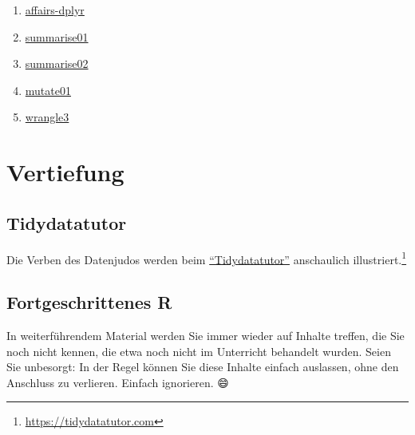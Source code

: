 \documentclass[
  letterpaper,
]{scrbook}
\theoremstyle{definition}
\theoremstyle{definition}
\theoremstyle{definition}
\theoremstyle{remark}
\begin{document}
\begin{enumerate}
\item
  \href{https://sebastiansauer.github.io/Datenwerk/posts/affairs-dplyr/affairs-dplyr.html}{affairs-dplyr}
\item
  \href{https://sebastiansauer.github.io/Datenwerk/posts/summarise01/summarise01.html}{summarise01}
\item
  \href{https://sebastiansauer.github.io/Datenwerk/posts/summarise02/summarise02.html}{summarise02}
\item
  \href{https://sebastiansauer.github.io/Datenwerk/posts/mutate01/mutate01.html}{mutate01}
\item
  \href{https://sebastiansauer.github.io/Datenwerk/posts/wrangle3/wrangle3}{wrangle3}
\end{enumerate}

\section{Vertiefung}\label{vertiefung-3}

\subsection{Tidydatatutor}\label{tidydatatutor}

Die Verben des Datenjudos werden beim
\href{https://tidydatatutor.com/}{\enquote{Tidydatatutor}} anschaulich
illustriert.\footnote{\url{https://tidydatatutor.com}}

\subsection{Fortgeschrittenes R}\label{fortgeschrittenes-r}

\begin{tcolorbox}[enhanced jigsaw, colbacktitle=quarto-callout-note-color!10!white, toptitle=1mm, colframe=quarto-callout-note-color-frame, breakable, toprule=.15mm, bottomrule=.15mm, bottomtitle=1mm, left=2mm, opacitybacktitle=0.6, colback=white, arc=.35mm, coltitle=black, title=\textcolor{quarto-callout-note-color}{\faInfo}\hspace{0.5em}{Hinweis}, opacityback=0, rightrule=.15mm, leftrule=.75mm, titlerule=0mm]

In weiterführendem Material werden Sie immer wieder auf Inhalte treffen,
die Sie noch nicht kennen, die etwa noch nicht im Unterricht behandelt
wurden. Seien Sie unbesorgt: In der Regel können Sie diese Inhalte
einfach auslassen, ohne den Anschluss zu verlieren. Einfach ignorieren.
😄

\end{tcolorbox}
\end{document}
